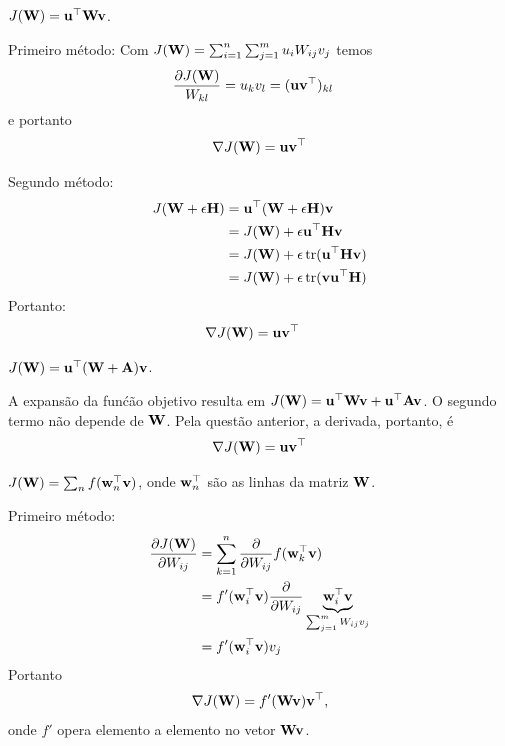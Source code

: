 \begin{exenumerate}
    \item $J(\mathbf{W}) = \mathbf{u}^\top\mathbf{W}\mathbf{v}$.
    
    \begin{solution}
        Primeiro m\'etodo: Com $J(\mathbf{W}) = \sum_{i=1}^n \sum_{j=1}^m u_iW_{ij}v_j$ temos
        \begin{align}
            \frac{\partial J(\mathbf{W})}{W_{kl}} &= u_kv_l = (\mathbf{u}\mathbf{v}^\top)_{kl}
        \end{align}
        e portanto
        \begin{equation}
            \nabla J(\mathbf{W}) = \mathbf{u}\mathbf{v}^\top
        \end{equation}
        
        Segundo m\'etodo: 
        \begin{align}
            J(\mathbf{W} + \epsilon \mathbf{H}) & = \mathbf{u}^\top (\mathbf{W}+\epsilon \mathbf{H})\mathbf{v}\\
            & = J(\mathbf{W}) + \epsilon \mathbf{u}^\top \mathbf{H} \mathbf{v}\\
            & = J(\mathbf{W}) + \epsilon \operatorname{tr}(\mathbf{u}^\top \mathbf{H} \mathbf{v})\\
            & = J(\mathbf{W}) + \epsilon \operatorname{tr}(\mathbf{v} \mathbf{u}^\top \mathbf{H})
        \end{align}
        Portanto:
        \begin{align}
            \nabla J(\mathbf{W}) & = \mathbf{u}\mathbf{v}^\top
        \end{align}
        
    \end{solution}
    
    \item $J(\mathbf{W}) = \mathbf{u}^\top(\mathbf{W}+\mathbf{A})\mathbf{v}$.
    \begin{solution}
        A expans\~ao da fun\'c\~ao objetivo resulta em $J(\mathbf{W}) = \mathbf{u}^\top \mathbf{W} \mathbf{v}
        + \mathbf{u}^\top \mathbf{A} \mathbf{v}$. O segundo termo n\~ao depende de $\mathbf{W}$. Pela quest\~ao anterior,
        a derivada, portanto, \'e
        \begin{equation}
            \nabla J(\mathbf{W}) = \mathbf{u} \mathbf{v}^\top
        \end{equation}
        
    \end{solution}
    \item $J(\mathbf{W}) = \sum_n f(\mathbf{w}_n^\top\mathbf{v})$, onde $\mathbf{w}_n^\top$ s\~ao as linhas da matriz $\mathbf{W}$.
    
    \begin{solution}
        Primeiro m\'etodo:
        \begin{align}
            \frac{\partial J(\mathbf{W})}{\partial W_{ij}} &= \sum_{k=1}^n \frac{\partial}{\partial W_{ij}} f(\mathbf{w}_k^\top\mathbf{v}) \\
            &= f'(\mathbf{w}_i^\top\mathbf{v}) \frac{\partial}{\partial W_{ij}} \underbrace{\mathbf{w}_i^\top\mathbf{v}}_\text{$\sum_{j=1}^m W_{ij}v_j$} \\
            &= f'(\mathbf{w}_i^\top\mathbf{v})v_j
        \end{align}
        Portanto
        \begin{equation}
            \nabla J(\mathbf{W}) = f'(\mathbf{W}\mathbf{v})\mathbf{v}^\top,
        \end{equation}
        onde $f'$ opera elemento a elemento no vetor $\mathbf{W}\mathbf{v}$.
        

\end{solution}
\end{exenumerate}
